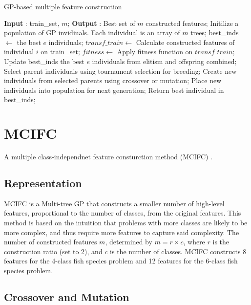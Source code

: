 \documentclass[runningheads]{llncs}
\begin{document}
\begin{algorithm}
\caption{GP-based multiple feature construction}
\label{alg:gp}
\begin{algorithmic}
\State \textbf{Input} : train\_set, $m$;
\State \textbf{Output} : Best set of $m$ constructed features;
\State Initilize a population of GP invidiuals. Each individual is an array of $m$ trees; 
\State best\_inds $\gets$ the best $e$ individuals; 
    \State $transf\_train \gets$ Calculate constructed features of individual $i$ on train\_set; 
    \State $fitness \gets$ Apply fitness function on $transf\_train$;
    \State Update best\_inds the best $e$ individuals from elitism and offspring combined;
  \EndFor
  \State Select parent individuals using tournament selection for breeding; 
  \State Create new individuals from selected parents using crossover or mutation; 
  \State Place new individuals into population for next generation; 
\EndWhile
\State Return best individual in best\_inds;
\end{algorithmic}
\end{algorithm}

\section{MCIFC}

A multiple class-independnet feature consturction method (MCIFC) \cite{tran2019genetic}.

\subsection{Representation}

MCIFC is a Multi-tree GP that constructs a smaller number of high-level features, proportional to the number of classes, from the original features. 
This method is based on the intuition that problems with more classes are likely to be more complex, and thus require more features to capture said complexity.
The number of constructed features $m$, determined by $m = r \times c$, where $r$ is the construction ratio (set to 2), and $c$ is the number of classes.
MCIFC constructs 8 features for the 4-class fish species problem and 12 features for the 6-class fish species problem.

\subsection{Crossover and Mutation}
\end{document}
